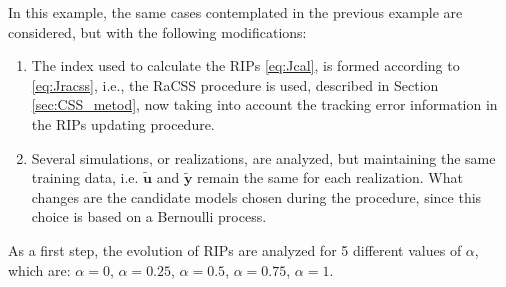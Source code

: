 
\begin{exmp} \label{ex:52}

In this example, the same cases contemplated in the previous example are considered, but with the following modifications:
\begin{enumerate}
   \setlength\itemsep{0.1pt}
   \item The index used to calculate the RIPs \eqref{eq:Jcal}, is formed according to \eqref{eq:Jracss}, i.e., the RaCSS procedure is used, described in Section \ref{sec:CSS_metod}, now taking into account the tracking error information in the RIPs updating procedure.
    \item Several simulations, or realizations, are analyzed, but maintaining the same training data, i.e. $\tilde{\bm{u}}$ and $\tilde{\bm{y}}$ remain the same for each realization. What changes are the candidate models chosen during the procedure, since this choice is based on a Bernoulli process.
\end{enumerate}

As a first step, the evolution of RIPs are analyzed for 5 different values of $\alpha$, which are: $\alpha=0$, $\alpha=0.25$, $\alpha=0.5$, $\alpha=0.75$, $\alpha=1$.


\end{exmp}
